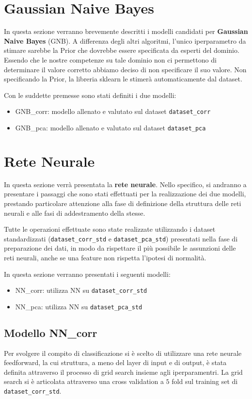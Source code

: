\newpage
\section{Gaussian Naive Bayes}
In questa sezione verranno brevemente descritti i
modelli candidati per \textbf{Gaussian Naive Bayes} (GNB). A differenza
degli altri algoritmi, l'unico iperparametro da stimare sarebbe la Prior che
dovrebbe essere specificata da esperti del dominio. Essendo che le nostre
competenze su tale dominio non ci permettono di determinare il valore corretto
abbiamo deciso di non specificare il suo valore.
Non specificando la Prior, la libreria sklearn le stimerà automaticamente 
dal dataset.

Con le suddette premesse sono stati definiti i due modelli:
\begin{itemize}
    \item GNB\_corr: modello allenato e valutato sul dataset \texttt{dataset\_corr}
    \item GNB\_pca: modello allenato e valutato sul dataset \texttt{dataset\_pca}
\end{itemize}

\section{Rete Neurale}
In questa sezione verrà presentata la \textbf{rete neurale}. Nello specifico, si
andranno a presentare i passaggi che sono stati effettuati per la realizzazione
dei due modelli, prestando particolare attenzione alla fase di definizione
della struttura delle reti neurali e alle fasi di addestramento della stesse.

Tutte le operazioni effettuate sono state realizzate utilizzando i dataset standardizzati
(\texttt{dataset\_corr\_std} e \texttt{dataset\_pca\_std}) presentati nella fase
di preparazione dei dati, in modo da rispettare il più possibile le assunzioni
delle reti neurali, anche se una feature non rispetta l'ipotesi di normalità.

In questa sezione verranno presentati i seguenti modelli:
\begin{itemize}
    \item NN\_corr: utilizza NN su \texttt{dataset\_corr\_std}
    \item NN\_pca: utilizza NN su \texttt{dataset\_pca\_std}
\end{itemize}

\subsection{Modello NN\_corr}
Per svolgere il compito di classificazione si è scelto di utilizzare una rete
neurale feedforward, la cui struttura, a meno del layer di input e di output, è
stata definita attraverso il processo di grid search insieme agli iperparamentri.
La grid search si è articolata attraverso una cross validation a $5$ fold sul training
set di \texttt{dataset\_corr\_std}.

